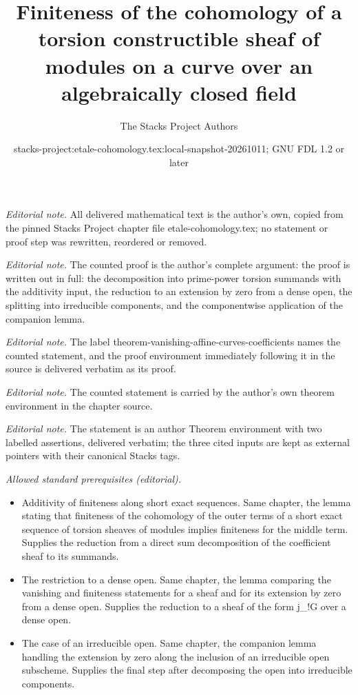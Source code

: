 \documentclass[10pt,a4paper]{amsart}
\title{Finiteness of the cohomology of a torsion constructible sheaf of modules on a curve over an algebraically closed field}
\author{The Stacks Project Authors}
\date{stacks-project:etale-cohomology.tex:local-snapshot-20261011; GNU FDL 1.2 or later}
\theoremstyle{plain}
\theoremstyle{definition}
\theoremstyle{remark}
\numberwithin{equation}{subsection}
\begin{document}
\maketitle
\noindent\textit{Editorial note.} All delivered mathematical text is the author's own, copied from the pinned Stacks Project chapter file etale-cohomology.tex; no statement or proof step was rewritten, reordered or removed.\par\medskip
\noindent\textit{Editorial note.} The counted proof is the author's complete argument: the proof is written out in full: the decomposition into prime-power torsion summands with the additivity input, the reduction to an extension by zero from a dense open, the splitting into irreducible components, and the componentwise application of the companion lemma.\par\medskip
\noindent\textit{Editorial note.} The label theorem-vanishing-affine-curves-coefficients names the counted statement, and the proof environment immediately following it in the source is delivered verbatim as its proof.\par\medskip
\noindent\textit{Editorial note.} The counted statement is carried by the author's own theorem environment in the chapter source.\par\medskip
\noindent\textit{Editorial note.} The statement is an author Theorem environment with two labelled assertions, delivered verbatim; the three cited inputs are kept as external pointers with their canonical Stacks tags.\par\medskip
\noindent\textit{Allowed standard prerequisites (editorial).}\begin{itemize}
\item Additivity of finiteness along short exact sequences. Same chapter, the lemma stating that finiteness of the cohomology of the outer terms of a short exact sequence of torsion sheaves of modules implies finiteness for the middle term. Supplies the reduction from a direct sum decomposition of the coefficient sheaf to its summands.
\item The restriction to a dense open. Same chapter, the lemma comparing the vanishing and finiteness statements for a sheaf and for its extension by zero from a dense open. Supplies the reduction to a sheaf of the form j\_!G over a dense open.
\item The case of an irreducible open. Same chapter, the companion lemma handling the extension by zero along the inclusion of an irreducible open subscheme. Supplies the final step after decomposing the open into irreducible components.
\end{itemize}\medskip
\end{document}
